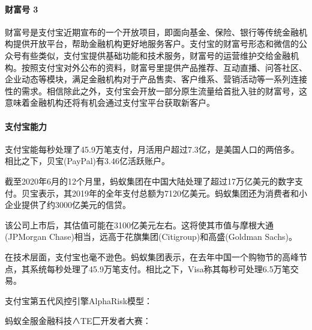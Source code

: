 \documentclass[letterpaper,11pt,english]{sphinxmanual}
\begin{document}
\paragraph{财富号 3\sphinxfootnotemark[881]}
\label{\detokenize{chapter_company/alipay:id9}}%
\begin{footnotetext}[881]\sphinxAtStartFootnote
{}
%
\end{footnotetext}\ignorespaces 
财富号是支付宝近期宣布的一个开放项目，即面向基金、保险、银行等传统金融机构提供开放平台，帮助金融机构更好地服务客户。支付宝的财富号形态和微信的公众号有些类似，支付宝提供基础功能和技术服务，财富号的运营维护交给金融机构。按照支付宝对外公布的资料，财富号里提供产品推荐、互动直播、问答社区、企业动态等模块，满足金融机构对于产品售卖、客户维系、营销活动等一系列连接性的需求。相信除此之外，支付宝会开放一部分原生流量给首批入驻的财富号，这意味着金融机构还将有机会通过支付宝平台获取新客户。


\paragraph{支付宝能力}
\label{\detokenize{chapter_company/alipay:id10}}
支付宝能每秒处理了45.9万笔支付，月活用户超过7.3亿，是美国人口的两倍多。相比之下，贝宝(PayPal)有3.46亿活跃账户。

截至2020年6月的12个月里，蚂蚁集团在中国大陆处理了超过17万亿美元的数字支付。贝宝表示，其2019年的全年支付总额为7120亿美元。蚂蚁集团还为消费者和小企业提供了约3000亿美元的信贷。

该公司上市后，其估值可能在3100亿美元左右。这将使其市值与摩根大通(JPMorgan
Chase)相当，远高于花旗集团(Citigroup)和高盛(Goldman Sachs)。

在技术层面，支付宝也毫不逊色。蚂蚁集团表示，在去年中国一个购物节的高峰节点，其系统每秒处理了45.9万笔支付。相比之下，Visa称其每秒可处理6.5万笔交易。

支付宝第五代风控引擎AlphaRisk模型：

蚂蚁全服金融科技∧TE匚开发者大赛：
\end{document}
